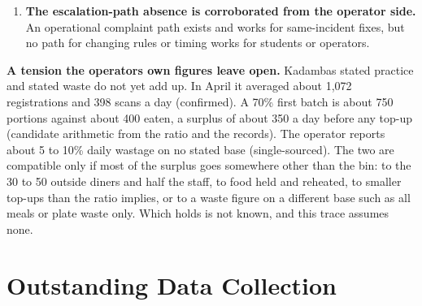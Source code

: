 \documentclass[
  10pt,
  table]{article}
\newcounter{none} %
\begin{document}
\begin{enumerate}
  \textbf{Under-provisioning is not the problem.} Two respondents independently said only about 30\% of registrants attend and the mess still struggles to serve even that smaller group, which early drafts read as under-provisioning. The attendance half is now confirmed: about 28\% at Yuktāhār in September and 37.1\% at Kadamba in April, a gap of 63 to 72\%. The under-provisioning reading does not hold. Every stated first-batch share sits well above that turnout, and at Bakul the share and weekend floor sit above even the manager\textquotesingle s own estimate (candidate, no records), and Yuktāhār\textquotesingle s book records leftovers. The shortage students feel is a timing and item-mix failure at the close. 26.5\% of Kadamba scans arrive in the last quarter hour, though the curve differs by hall, since the Bakul manager describes an earlier peak. The items students report running out (idli, puri, bhatura, fruit) include those Kadamba says float above gram standard (puri, idli), while the ones it says waste (uttapam, set dosa, upma) are left over, and late run-outs are not re-cooked. Over-preparation and run-outs happen on the same morning.
\item
  \textbf{The escalation-path absence is corroborated from the operator side.} An operational complaint path exists and works for same-incident fixes, but no path for changing rules or timing works for students or operators.
\end{enumerate}

\textbf{A tension the operator\textquotesingle s own figures leave open.} Kadamba\textquotesingle s stated practice and stated waste do not yet add up. In April it averaged about 1,072 registrations and 398 scans a day (confirmed). A 70\% first batch is about 750 portions against about 400 eaten, a surplus of about 350 a day before any top-up (candidate arithmetic from the ratio and the records). The operator reports about 5 to 10\% daily wastage on no stated base (single-sourced). The two are compatible only if most of the surplus goes somewhere other than the bin: to the 30 to 50 outside diners and half the staff, to food held and reheated, to smaller top-ups than the ratio implies, or to a waste figure on a different base such as all meals or plate waste only. Which holds is not known, and this trace assumes none.

\section{Outstanding Data Collection}\label{outstanding-data-collection}
\end{document}
